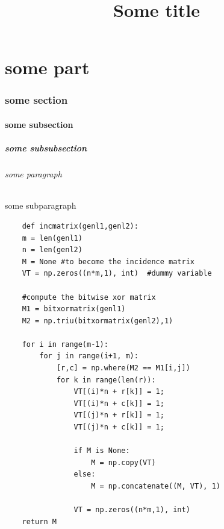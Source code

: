\documentclass[11pt, parskip=half]{scrartcl}
\begin{document}
\title{Some title}
\maketitle
\tableofcontents


\part{some part}
\section{some section}
\subsection{some subsection}
\subsubsection{some subsubsection}
\paragraph{some paragraph}
\subparagraph{some subparagraph}

\begin{verbatim}
    def incmatrix(genl1,genl2):
    m = len(genl1)
    n = len(genl2)
    M = None #to become the incidence matrix
    VT = np.zeros((n*m,1), int)  #dummy variable
    
    #compute the bitwise xor matrix
    M1 = bitxormatrix(genl1)
    M2 = np.triu(bitxormatrix(genl2),1) 

    for i in range(m-1):
        for j in range(i+1, m):
            [r,c] = np.where(M2 == M1[i,j])
            for k in range(len(r)):
                VT[(i)*n + r[k]] = 1;
                VT[(i)*n + c[k]] = 1;
                VT[(j)*n + r[k]] = 1;
                VT[(j)*n + c[k]] = 1;
                
                if M is None:
                    M = np.copy(VT)
                else:
                    M = np.concatenate((M, VT), 1)
                
                VT = np.zeros((n*m,1), int)
    return M
\end{verbatim}
\end{document}
